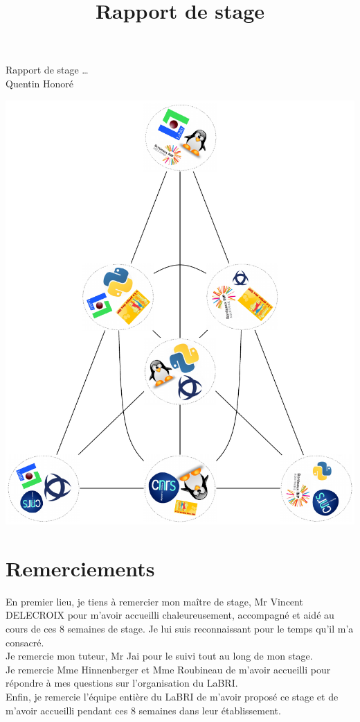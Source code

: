 \documentclass[a4paper]{article}
\title{Rapport de stage}
\begin{document}
\thispagestyle{empty}


\vspace{1cm}
\begin{center}
{\Huge Rapport de stage \ldots} \\ \vspace{0.3cm}
{\large Quentin Honoré}
\end{center}
\hspace{-1.5cm}
\includegraphics{garde.pdf}

\newpage
\tableofcontents
\newpage
\section*{Remerciements}
En premier lieu, je tiens à remercier mon maître de stage, Mr Vincent DELECROIX pour m'avoir accueilli chaleureusement, accompagné et aidé au cours de ces 8 semaines de stage. Je lui suis reconnaissant pour le temps qu'il m'a consacré.\\
Je remercie mon tuteur, Mr Jai pour le suivi tout au long de mon stage.\\
Je remercie Mme Hinnenberger et Mme Roubineau de m'avoir accueilli pour répondre à mes questions sur l'organisation du LaBRI.\\
Enfin, je remercie l'équipe entière du LaBRI de m'avoir proposé ce stage et de m'avoir accueilli pendant ces 8 semaines dans leur établissement.
\newpage
\end{document}

